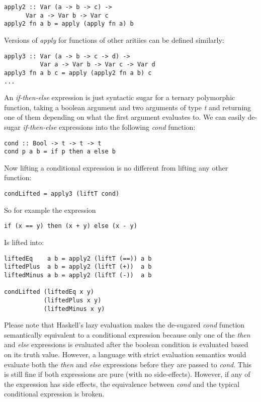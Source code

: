 \documentclass[10pt,conference]{llncs}
\begin{document}
\begin{exmp}
\begin{verbatim}
apply2 :: Var (a -> b -> c) -> 
	  Var a -> Var b -> Var c
apply2 fn a b = apply (apply fn a) b
\end{verbatim}

Versions of \emph{apply} for functions of other aritiies  can be defined similarly:

\begin{verbatim}
apply3 :: Var (a -> b -> c -> d) -> 
          Var a -> Var b -> Var c -> Var d
apply3 fn a b c = apply (apply2 fn a b) c
...
\end{verbatim}

\end{exmp}

\begin{exmp}

An \emph{if-then-else} expression is just syntactic sugar for a ternary polymorphic function, taking a boolean argument and two arguments of type \emph{t} and returning one of them depending on what the first argument evaluates to. We can easily de-sugar \emph{if-then-else} expressions into the following \emph{cond} function:

\begin{verbatim}
cond :: Bool -> t -> t -> t
cond p a b = if p then a else b
\end{verbatim}

Now lifting a conditional expression is no different from lifting any other function:

\begin{verbatim}
condLifted = apply3 (liftT cond)
\end{verbatim}

So for example the expression

\begin{verbatim}
if (x == y) then (x + y) else (x - y)
\end{verbatim}

Is lifted into:

\begin{verbatim}
liftedEq    a b = apply2 (liftT (==)) a b
liftedPlus  a b = apply2 (liftT (+))  a b
liftedMinus a b = apply2 (liftT (-))  a b

condLifted (liftedEq x y) 
           (liftedPlus x y) 
           (liftedMinus x y)
\end{verbatim}

Please note that Haskell's lazy evaluation makes the de-sugared \emph{cond} function semantically equivalent to a conditional expression because only one of the \emph{then} and \emph{else} expressions is evaluated after the boolean condition is evaluated based on its truth value. However, a language with strict evaluation semantics would evaluate both the \emph{then} and \emph{else} expressions before they are passed to \emph{cond}. This is still fine if both expressions are pure (with no side-effects). However, if any of the expression has side effects, the equivalence between \emph{cond} and the typical conditional expression is broken.

\end{exmp}
\end{document}
